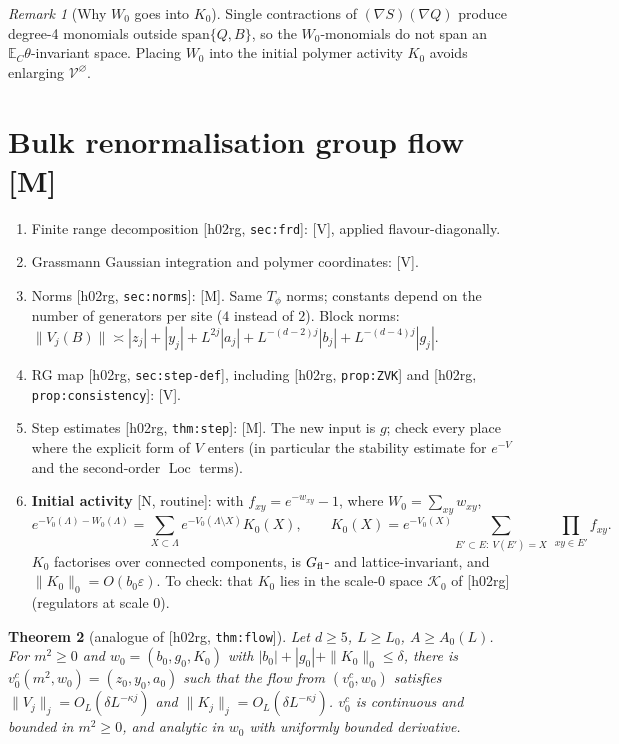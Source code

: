 \documentclass[11pt]{article}
\newtheorem{theorem}{Theorem}[section]
\theoremstyle{remark}
\newtheorem{remark}[theorem]{Remark}
\theoremstyle{definition}
\newcommand{\E}{\mathbb{E}}
\newcommand{\Loc}{\operatorname{Loc}}
\newcommand{\cV}{\mathcal{V}}
\newcommand{\st}[1]{\textsf{[#1]}}
\newcommand{\hr}[1]{\textup{[h02rg, \texttt{#1}]}}
\begin{document}
\begin{remark}[Why $W_0$ goes into $K_0$]
Single contractions of $(\nabla S)(\nabla Q)$ produce degree-4 monomials outside $\mathrm{span}\{Q,B\}$, so the $W_0$-monomials do not span an
$\E_C\theta$-invariant space. Placing $W_0$ into the initial polymer activity $K_0$ avoids enlarging $\cV^\varnothing$.
\end{remark}

\section{Bulk renormalisation group flow \st{M}}

\begin{enumerate}[label=(\alph*)]
\item Finite range decomposition \hr{sec:frd}: \st{V}, applied flavour-diagonally.
\item Grassmann Gaussian integration and polymer coordinates: \st{V}.
\item Norms \hr{sec:norms}: \st{M}. Same $T_\phi$ norms; constants depend on the number of generators per site ($4$ instead of $2$).
  Block norms: $\|V_j(B)\|\asymp|z_j|+|y_j|+L^{2j}|a_j|+L^{-(d-2)j}|b_j|+L^{-(d-4)j}|g_j|$.
\item RG map \hr{sec:step-def}, including \hr{prop:ZVK} and \hr{prop:consistency}: \st{V}.
\item Step estimates \hr{thm:step}: \st{M}. The new input is $g$; check every place where the explicit form of $V$ enters
  (in particular the stability estimate for $e^{-V}$ and the second-order $\Loc$ terms).
\item \textbf{Initial activity} \st{N, routine}: with $f_{xy}=e^{-w_{xy}}-1$, where $W_0=\sum_{xy}w_{xy}$,
  \begin{equation}
    e^{-V_0(\Lambda)-W_0(\Lambda)}=\sum_{X\subset\Lambda}e^{-V_0(\Lambda\setminus X)}K_0(X),\qquad
    K_0(X)=e^{-V_0(X)}\sum_{E'\subset E:\ V(E')=X}\ \prod_{xy\in E'}f_{xy}.
  \end{equation}
  $K_0$ factorises over connected components, is $G_{\rm fl}$- and lattice-invariant, and $\|K_0\|_0=O(b_0\varepsilon)$.
  To check: that $K_0$ lies in the scale-$0$ space $\mathcal K_0$ of [h02rg] (regulators at scale $0$).
\end{enumerate}

\begin{theorem}[analogue of \hr{thm:flow}]\label{thm:flow5}
Let $d\ge5$, $L\ge L_0$, $A\ge A_0(L)$. For $m^2\ge0$ and $w_0=(b_0,g_0,K_0)$ with $|b_0|+|g_0|+\|K_0\|_0\le\delta$,
there is $v_0^c(m^2,w_0)=(z_0,y_0,a_0)$ such that the flow from $(v_0^c,w_0)$ satisfies
$\|V_j\|_j=O_L(\delta L^{-\kappa j})$ and $\|K_j\|_j=O_L(\delta L^{-\kappa j})$.
$v_0^c$ is continuous and bounded in $m^2\ge0$, and analytic in $w_0$ with uniformly bounded derivative.
\end{theorem}
\end{document}

